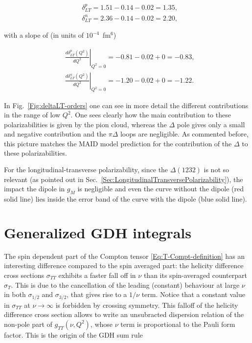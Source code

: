 \documentclass[prc,twocolumn,showpacs,preprintnumbers,amsmath,amssymb
,superscriptaddress,a4paper,nofootinbib
]{revtex4-1}
\begin{document}
\begin{align}\label{Eq:deltaLTRealPoint}
&\delta^p_{LT} = 1.51 -0.14 -0.02 = 1.35, \\
&\delta^n_{LT} = 2.36 -0.14 -0.02 =2.20, 
\end{align}

with a slope of (in units of $10^{-4}$~fm$^6$)

\begin{align}
&\left.\frac{d\delta_{LT}^p (Q^2)}{dQ^2}\right|_{Q^2=0}=  -0.81 - 0.02 + 0 = -0.83,\\
&\left.\frac{d\delta_{LT}^n (Q^2)}{dQ^2}\right|_{Q^2=0}=  -1.20 - 0.02 + 0 = -1.22.
\end{align}

In Fig.~\ref{Fig:deltaLT-orders} one can see in more detail the different contributions in the range of low $Q^2$.
One sees clearly how the main contribution to these polarizabilities is given by the pion cloud, whereas the $\Delta$ pole gives only a small and negative contribution and the $\pi \Delta$ loops are negligible. 
As commented before, this picture matches the MAID model prediction for the contribution of the $\Delta$ to these polarizabilities.



For the longitudinal-transverse polarizability, since the $\Delta(1232)$ is not so relevant (as pointed out in Sec.~\ref{Sec:LongitudinalTransversePolarizability}), the impact the dipole in $g_M$ is negligible and even the curve without the dipole (red solid line) lies inside the error band of the curve with the dipole (blue solid line).





\section{Generalized GDH integrals}
\label{Sec:GeneralizedGDH}

The spin dependent part of the Compton tensor \eqref{Eq:T-Compt-definition} has an interesting difference compared to the spin averaged part: the helicity difference cross sections $\sigma_{TT}$ exhibits a faster fall off in $\nu$ than its spin-averaged counterpart $\sigma_{T}$. 
This is due to the cancellation of the leading (constant) behaviour at large $\nu$ in both $\sigma_{1/2}$ and $\sigma_{3/2}$, that gives rise to a $1/\nu$ term.
Notice that a constant value in $\sigma_{TT}$ at $\nu\to \infty$ is forbidden by crossing symmetry.
This falloff of the helicity difference cross section allows to write an unsubracted dispersion relation of the non-pole part of $g_{TT}(\nu,Q^2)$, whose $\nu$ term is proportional to the Pauli form factor.
This is the origin of the GDH sum rule
\end{document}
